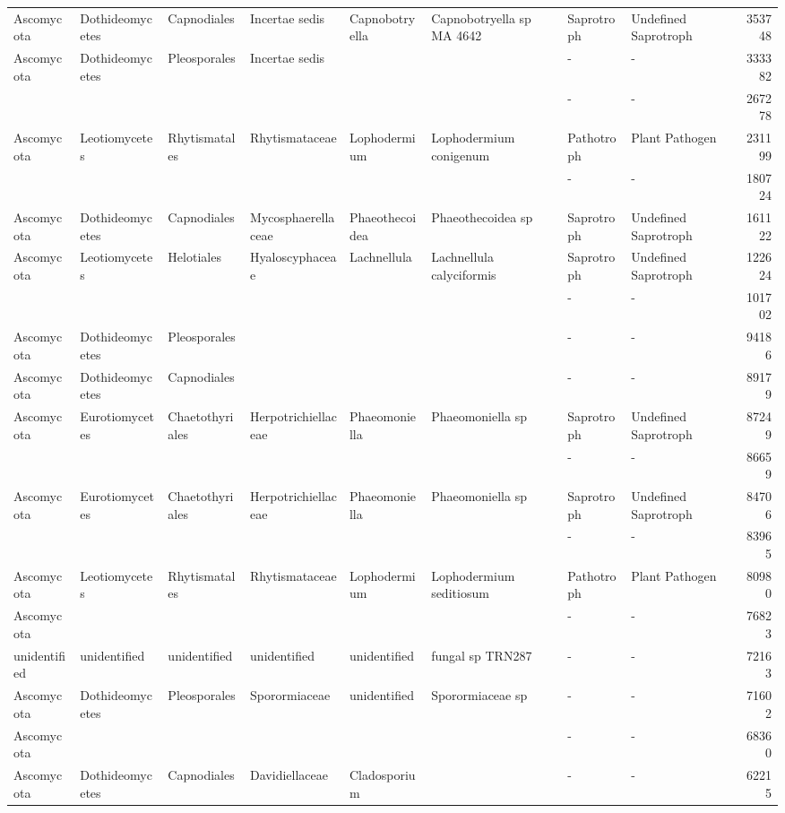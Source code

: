 \documentclass[12pt]{article}\usepackage[]{graphicx}\usepackage[]{color}
\numberwithin{figure}{section}
\begin{document}
\begin{landscape}
\begin{table}[ht]
\begin{tabular}{llllllllr}
  Ascomycota & Dothideomycetes & Capnodiales & Incertae sedis & Capnobotryella & Capnobotryella sp MA 4642 & Saprotroph & Undefined Saprotroph & 353748 \\ 
  Ascomycota & Dothideomycetes & Pleosporales & Incertae sedis &  &  & - & - & 333382 \\ 
   &  &  &  &  &  & - & - & 267278 \\ 
  Ascomycota & Leotiomycetes & Rhytismatales & Rhytismataceae & Lophodermium & Lophodermium conigenum & Pathotroph & Plant Pathogen & 231199 \\ 
   &  &  &  &  &  & - & - & 180724 \\ 
  Ascomycota & Dothideomycetes & Capnodiales & Mycosphaerellaceae & Phaeothecoidea & Phaeothecoidea sp & Saprotroph & Undefined Saprotroph & 161122 \\ 
  Ascomycota & Leotiomycetes & Helotiales & Hyaloscyphaceae & Lachnellula & Lachnellula calyciformis & Saprotroph & Undefined Saprotroph & 122624 \\ 
   &  &  &  &  &  & - & - & 101702 \\ 
  Ascomycota & Dothideomycetes & Pleosporales &  &  &  & - & - & 94186 \\ 
  Ascomycota & Dothideomycetes & Capnodiales &  &  &  & - & - & 89179 \\ 
  Ascomycota & Eurotiomycetes & Chaetothyriales & Herpotrichiellaceae & Phaeomoniella & Phaeomoniella sp & Saprotroph & Undefined Saprotroph & 87249 \\ 
   &  &  &  &  &  & - & - & 86659 \\ 
  Ascomycota & Eurotiomycetes & Chaetothyriales & Herpotrichiellaceae & Phaeomoniella & Phaeomoniella sp & Saprotroph & Undefined Saprotroph & 84706 \\ 
   &  &  &  &  &  & - & - & 83965 \\ 
  Ascomycota & Leotiomycetes & Rhytismatales & Rhytismataceae & Lophodermium & Lophodermium seditiosum & Pathotroph & Plant Pathogen & 80980 \\ 
  Ascomycota &  &  &  &  &  & - & - & 76823 \\ 
  unidentified & unidentified & unidentified & unidentified & unidentified & fungal sp TRN287 & - & - & 72163 \\ 
  Ascomycota & Dothideomycetes & Pleosporales & Sporormiaceae & unidentified & Sporormiaceae sp & - & - & 71602 \\ 
  Ascomycota &  &  &  &  &  & - & - & 68360 \\ 
  Ascomycota & Dothideomycetes & Capnodiales & Davidiellaceae & Cladosporium &  & - & - & 62215 \\ 

\end{tabular}
\end{table}
\end{landscape}
\end{document}
